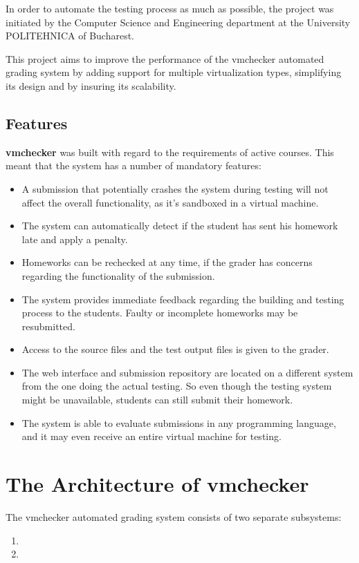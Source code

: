In order to automate the testing process as much as possible, the \project project 
was initiated by the Computer Science and Engineering department at the 
University POLITEHNICA of Bucharest.

This project aims to improve the performance of the vmchecker automated grading
system by adding support for multiple virtualization types, simplifying its
design and by insuring its scalability.


\subsection{Features}
\label{sub-sec:vmc-history-features}

{\bf vmchecker} was built with regard to the requirements of active courses. This
meant that the system has a number of mandatory features:

\begin{itemize}
\item A submission that potentially crashes the system during testing will not affect
the overall functionality, as it's sandboxed in a virtual machine.
\item The system can automatically detect if the student has sent his homework late
and apply a penalty.
\item Homeworks can be rechecked at any time, if the grader has concerns regarding
the functionality of the submission.
\item The system provides immediate feedback regarding the building and testing 
process to the students. Faulty or incomplete homeworks may be resubmitted.
\item Access to the source files and the test output files is given to the grader.
\item The web interface and submission repository are located on a different system
from the one doing the actual testing. So even though the testing system might
be unavailable, students can still submit their homework.
\item The system is able to evaluate submissions in any programming language,
and it may even receive an entire virtual machine for testing.
\end{itemize}


\section{The Architecture of vmchecker}
\label{sec:vmc-architecture}

The vmchecker automated grading system consists of two separate subsystems:
\begin{enumerate}
\item {}
\item {}
\end{enumerate}

